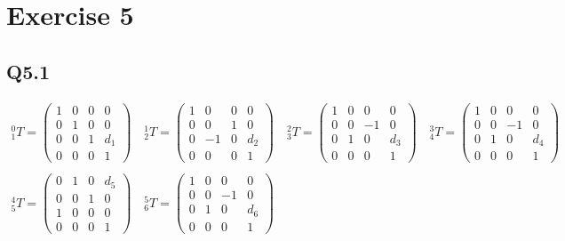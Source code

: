 \section{Exercise 5} \label{P5}
\subsection{Q5.1}
\begin{gather}
	^0_1 T = \begin{pmatrix}
        1 & 0 & 0 & 0 \\
        0 & 1 & 0 & 0 \\
        0 & 0 & 1 & d_1 \\
        0 & 0 & 0 & 1
    \end{pmatrix} \quad
    ^1_2 T = \begin{pmatrix}
        1 & 0 & 0 & 0 \\
        0 & 0 & 1 & 0 \\
        0 & -1 & 0 & d_2 \\
        0 & 0 & 0 & 1
    \end{pmatrix} \quad
    ^2_3 T = \begin{pmatrix}
        1 & 0 & 0 & 0 \\
        0 & 0 & -1 & 0 \\
        0 & 1 & 0 & d_3 \\
        0 & 0 & 0 & 1
    \end{pmatrix} \quad
    ^3_4 T = \begin{pmatrix}
        1 & 0 & 0 & 0 \\
        0 & 0 & -1 & 0 \\
        0 & 1 & 0 & d_4 \\
        0 & 0 & 0 & 1
    \end{pmatrix} \nonumber \\
    \nonumber \\
    ^4_5 T = \begin{pmatrix}
        0 & 1 & 0 & d_5 \\
        0 & 0 & 1 & 0 \\
        1 & 0 & 0 & 0 \\
        0 & 0 & 0 & 1
    \end{pmatrix} \quad
    ^5_6 T = \begin{pmatrix}
        1 & 0 & 0 & 0 \\
        0 & 0 & -1 & 0 \\
        0 & 1 & 0 & d_6 \\
        0 & 0 & 0 & 1
    \end{pmatrix} \quad

\end{gather}
